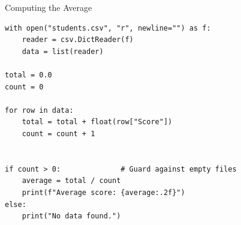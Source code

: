 \documentclass{csbeamer}
\begin{document}
\begin{frame}[fragile]{Computing the Average}
    \begin{lstlisting}
with open("students.csv", "r", newline="") as f:
    reader = csv.DictReader(f)
    data = list(reader)

total = 0.0
count = 0

for row in data:
    total = total + float(row["Score"])
    count = count + 1


if count > 0:              # Guard against empty files
    average = total / count
    print(f"Average score: {average:.2f}")
else:
    print("No data found.")
    \end{lstlisting}
\end{frame}


\end{document}
